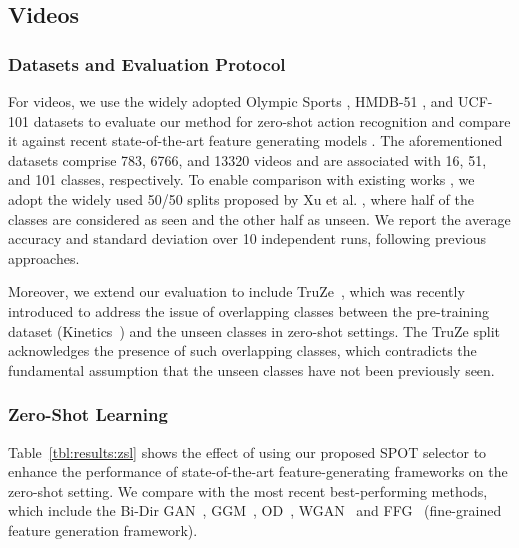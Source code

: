 \documentclass[10pt,twocolumn,letterpaper]{article}
\begin{document}
\subsection{Videos}

\subsubsection{Datasets and Evaluation Protocol}

For videos, we use the widely adopted Olympic Sports \cite{olympics}, HMDB-51 \cite{hmdb}, and UCF-101 \cite{ucf101} datasets to evaluate our method for zero-shot action recognition and compare it against recent state-of-the-art feature generating models \cite{OD, clswgan, finegrain}. The aforementioned datasets comprise 783, 6766, and 13320 videos and are associated with 16, 51, and 101 classes, respectively. To enable comparison with existing works \cite{OD, clswgan, finegrain, GGM2018, syn}, we adopt the widely used 50/50 splits proposed by Xu et al. \cite{xu2017transductive}, where half of the classes are considered as seen and the other half as unseen. We report the average accuracy and standard deviation over 10 independent runs, following previous approaches.

Moreover, we extend our evaluation to include TruZe~\cite{truze}, which was recently introduced to address the issue of overlapping classes between the pre-training dataset (Kinetics~\cite{i3d}) and the unseen classes in zero-shot settings. The TruZe split acknowledges the presence of such overlapping classes, which contradicts the fundamental assumption that the unseen classes have not been previously seen.


\subsubsection{Zero-Shot Learning}

Table~\ref{tbl:results:zsl} shows the effect of using our proposed SPOT selector to enhance the performance of state-of-the-art feature-generating frameworks on the zero-shot setting. We compare with the most recent best-performing methods, which include the Bi-Dir GAN~\cite{syn}, GGM~\cite{GGM2018}, OD~\cite{OD}, WGAN~\cite{clswgan} and FFG~\cite{finegrain} (fine-grained feature generation framework).
\end{document}
